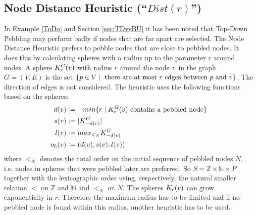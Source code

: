 \documentclass{llncs}
\newcommand{\defeq}{\mathrel{\mathop:}=}
\begin{document}
\subsection{Node Distance Heuristic (``$Dist(r)$'')}
\label{sec:distance}

In Example \ref{ToDo} and Section \ref{sec:TDvsBU} it has been noted that Top-Down Pebbling may perform badly if nodes that are far apart are selected. The Node Distance Heuristic prefers to pebble nodes that are close to pebbled nodes. It does this by calculating spheres with a radius up to the parameter $r$ around nodes.
A sphere $K_r^{G}(v)$ with radius $r$ around the node $v$ in the graph $G = (V,E)$ is the set $\{p \in V \mid \text{ there are at most } r \text{ edges between } p \text{ and } v\}$. The direction of edges is not considered. The heuristic uses the following functions based on the spheres:
\begin{align*}
d(\n) &\defeq -min\{r \mid K_r^{G}(\n)\text{ contains a pebbled node}\}\\
	s(\n) &\defeq |K_{-d(\n)}^G|\\
	l(\n) &\defeq max_{<_N}K_{-d(\n)}^G\\
	o_h(\n) &\defeq (d(\n),s(\n),l(\n))
\end{align*}
where $<_N$ denotes the total order on the initial sequence of pebbled nodes $N$, i.e. nodes in spheres that were pebbled later are preferred.
So $S = \mathbb{Z} \times \mathbb{N} \times P$ together with the lexicographic order using, respectively, the natural smaller relation $<$ on $\mathbb{Z}$ and $\mathbb{N}$ and $<_N$ on $N$. The spheres $K_r(v)$ can grow exponentially in $r$. Therefore the maximum radius has to be limited and if no pebbled node is found within this radius, another heuristic has to be used.
\end{document}
